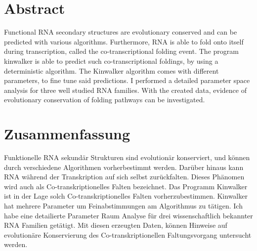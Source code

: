 \begingroup
\let\clearpage\relax
\let\cleardoublepage\relax
\let\cleardoublepage\relax

\chapter*{Abstract}
Functional RNA secondary structures are evolutionary conserved and can be predicted with various algorithms. Furthermore, RNA is able to fold onto itself during transcription, called the co-transcriptional folding event. The program kinwalker is able to predict such co-transcriptional foldings, by using a deterministic algorithm. The Kinwalker algorithm comes with different parameters, to fine tune said predictions. I performed a detailed parameter space analysis for three well studied RNA families. With the created data, evidence of evolutionary conservation of folding pathways can be investigated.




\vfill
{}
\chapter*{Zusammenfassung}



Funktionelle RNA sekund{\"a}r Strukturen sind evolution{\"a}r konserviert, und k{\"o}nnen durch verschiedene Algorithmen vorherbestimmt werden. Dar{\"u}ber hinaus kann RNA w{\"a}hrend der Transkription auf sich selbst zur{\"u}ckfalten. Dieses Ph{\"a}nomen wird auch als Co-transkriptionelles Falten bezeichnet. Das Programm Kinwalker ist in der Lage solch Co-transkriptionelles Falten vorherzubestimmen. Kinwalker hat mehrere Parameter um Feinabstimmungen am Algorithmus zu t{\"a}tigen. Ich habe eine detailierte Parameter Raum Analyse f{\"u}r drei wissenschaftlich bekannter RNA Familien get{\"a}tigt. Mit diesen erzeugten Daten, k{\"o}nnen Hinweise auf evolution{\"a}re Konservierung des Co-transkriptionellen Faltungsvorgang untersucht werden.




\endgroup			

\vfill